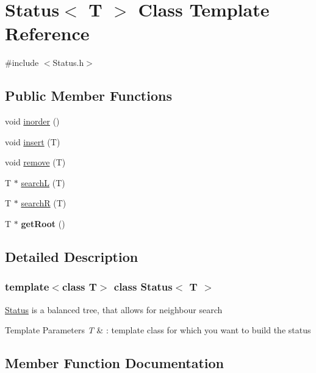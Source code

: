\hypertarget{classStatus}{}\section{Status$<$ T $>$ Class Template Reference}
\label{classStatus}


{\ttfamily \#include $<$Status.\+h$>$}

\subsection*{Public Member Functions}
\begin{DoxyCompactItemize}
\item 
void \hyperlink{classStatus_aa019369b98450d3003f6359003fcb348}{inorder} ()
\item 
void \hyperlink{classStatus_a5fd5e49c03713d3b918010a15595d169}{insert} (T)
\item 
void \hyperlink{classStatus_afe333856c09425b4e0c7071ab4a700a5}{remove} (T)
\item 
T $\ast$ \hyperlink{classStatus_a0b6a56cd7787478d30814c372ce7aff3}{searchL} (T)
\item 
T $\ast$ \hyperlink{classStatus_a8db67cdc477f8f55b5c16678b2ec27f0}{searchR} (T)
\item 
\mbox{\label{classStatus_a433d00a0bdbc4a8017ede04acf2060c1}} 
T $\ast$ {\bfseries get\+Root} ()
\end{DoxyCompactItemize}


\subsection{Detailed Description}
\subsubsection*{template$<$class T$>$\newline
class Status$<$ T $>$}

\hyperlink{classStatus}{Status} is a balanced tree, that allows for neighbour search 
\begin{DoxyTemplParams}{Template Parameters}
{\em T} & \+: template class for which you want to build the status \\
\hline
\end{DoxyTemplParams}


\subsection{Member Function Documentation}
\mbox{\label{classStatus_aa019369b98450d3003f6359003fcb348}} 
